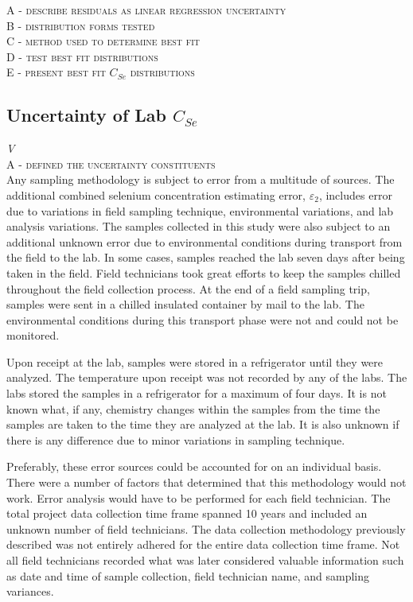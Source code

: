 \begin{linenumbers}
\textsc{A - describe residuals as linear regression uncertainty}\\

\textsc{B - distribution forms tested}\\

\textsc{C - method used to determine best fit}\\

\textsc{D - test best fit distributions}\\

\textsc{E - present best fit $C_{Se}$ distributions}\\

\clearpage{}
\subsection{Uncertainty of Lab $C_{Se}$}
\emph{V}\\

\textsc{A - defined the uncertainty constituents}\\
Any sampling methodology is subject to error from a multitude of sources.  The additional combined selenium concentration estimating error, $\varepsilon_{2}$, includes error due to variations in field sampling technique, environmental variations, and lab analysis variations.  The samples collected in this study were also subject to an additional unknown error due to environmental conditions during transport from the field to the lab.  In some cases, samples reached the lab seven days after being taken in the field.  Field technicians took great efforts to keep the samples chilled throughout the field collection process.  At the end of a field sampling trip, samples were sent in a chilled insulated container by mail to the lab.  The environmental conditions during this transport phase were not and could not be monitored.

Upon receipt at the lab, samples were stored in a refrigerator until they were analyzed.  The temperature upon receipt was not recorded by any of the labs.  The labs stored the samples in a refrigerator for a maximum of four days.  It is not known what, if any, chemistry changes within the samples from the time the samples are taken to the time they are analyzed at the lab.  It is also unknown if there is any difference due to minor variations in sampling technique.

Preferably, these error sources could be accounted for on an individual basis.  There were a number of factors that determined that this methodology would not work.  Error analysis would have to be performed for each field technician.  The total project data collection time frame spanned 10 years and included an unknown number of field technicians.  The data collection methodology previously described was not entirely adhered for the entire data collection time frame.  Not all field technicians recorded what was later considered valuable information such as date and time of sample collection, field technician name, and sampling variances.


\end{linenumbers}
